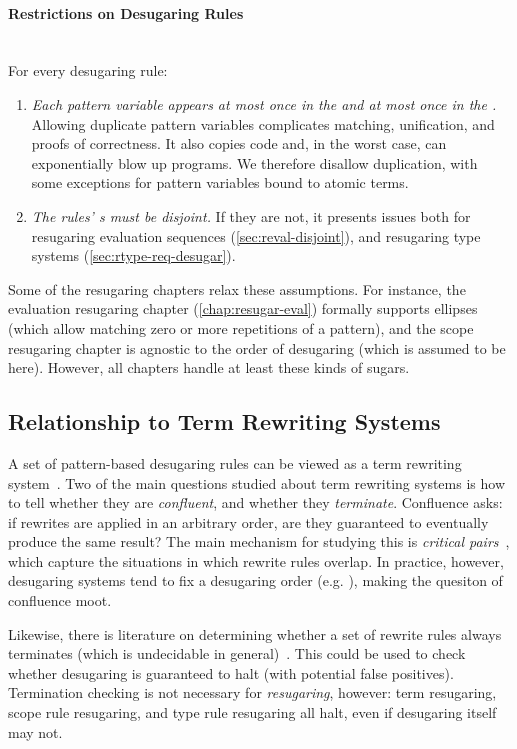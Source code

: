 \paragraph{Restrictions on Desugaring Rules}\\ \noindent
For every desugaring rule:
\begin{enumerate}
\item \emph{Each pattern variable appears at most once in the  and at
  most once in the .}
  Allowing duplicate pattern variables complicates matching, unification,
  and proofs of correctness. It also copies code
  and, in the worst case, can exponentially blow up programs.
  We therefore disallow duplication,
  with some exceptions for pattern variables bound to atomic terms.
\item \emph{The rules' s must be disjoint.} If they
  are not, it presents issues both for resugaring evaluation sequences
  (\cref{sec:reval-disjoint}), and resugaring type systems
  (\cref{sec:rtype-req-desugar}).
\end{enumerate}

Some of the resugaring chapters relax these assumptions. For instance, the
evaluation resugaring chapter (\cref{chap:resugar-eval}) formally
supports ellipses (which allow matching zero or more repetitions of a
pattern), and the scope resugaring chapter is agnostic to the order of
desugaring (which is assumed to be  here). However, all
chapters handle at least these kinds of sugars.

\subsection{Relationship to Term Rewriting Systems}

A set of pattern-based desugaring rules can be viewed as a term
rewriting system~\cite{trs}. Two of the main questions studied about
term rewriting systems is how to tell whether they are
\emph{confluent}, and whether they \emph{terminate}. Confluence asks:
if rewrites are applied in an arbitrary order, are they guaranteed to
eventually produce the same result? The main mechanism for studying
this is \emph{critical pairs}~\cite{critical-pairs},
which capture the situations in which rewrite rules overlap. In
practice, however, desugaring systems tend to fix a desugaring order
(e.g. ), making the quesiton of confluence moot.

Likewise, there is literature on determining whether a set of rewrite
rules always terminates (which is undecidable in
general)~\cite{trs-termination-undecidable}. This could be used to
check whether desugaring is guaranteed to halt (with potential false
positives). Termination checking is not necessary for
\emph{resugaring}, however: term resugaring, scope rule resugaring,
and type rule resugaring all halt, even if desugaring itself may not.
